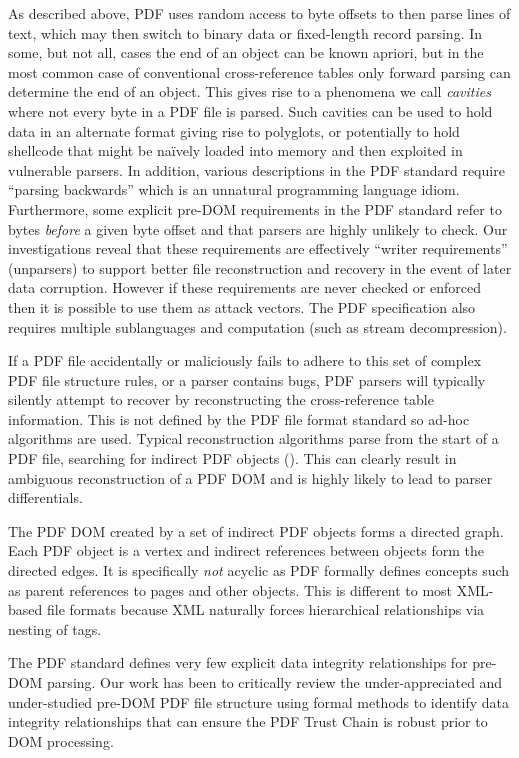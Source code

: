 As described above, PDF uses random access to byte offsets to then parse lines of text,
which may then switch to binary data or fixed-length record parsing. 
In some, but not all, cases the end of an object can be known apriori, but in the most common case 
of conventional cross-reference tables only forward parsing can determine the end of an object. 
This gives rise to a phenomena we call \emph{cavities} where not every byte in a PDF file is parsed.
Such cavities can be used to hold data in an alternate format giving rise to polyglots, or potentially
to hold shellcode that might be na\"ively loaded into memory and then exploited 
in vulnerable parsers.
In addition, various descriptions in the PDF standard require ``parsing backwards'' which is 
an unnatural programming language idiom. Furthermore, some explicit pre-DOM requirements
in the PDF standard
refer to bytes \emph{before} a given byte offset and that parsers are highly unlikely to check. 
Our investigations reveal that these requirements are effectively ``writer requirements'' (unparsers) to
support better file reconstruction and recovery in the event of later data corruption. 
However if these requirements are never checked or enforced then it is possible to use them as attack
vectors.  
The PDF specification also requires multiple
sublanguages and computation (such as stream decompression).

If a PDF file accidentally or maliciously fails to adhere to this set of complex PDF file structure
rules, or a parser contains bugs, PDF parsers will typically silently attempt to recover
by reconstructing the cross-reference table information. 
This is not defined by the PDF file format standard so 
ad-hoc algorithms are used. Typical reconstruction algorithms parse from the start of a PDF 
file, searching for indirect PDF objects (). This can clearly result
in ambiguous reconstruction of a PDF DOM and is highly likely to lead to parser differentials.

The PDF DOM created by a set of indirect PDF objects forms a directed graph. 
Each PDF object is a vertex and indirect references between objects form the directed edges. It is 
specifically \emph{not} acyclic as PDF formally defines concepts such as parent references to 
pages and other objects. This is different to most XML-based file formats because XML naturally 
forces hierarchical relationships via nesting of tags.

The PDF standard defines very few explicit data integrity relationships for pre-DOM parsing. 
Our work has been to critically review the under-appreciated and under-studied pre-DOM PDF
file structure using formal methods to identify data integrity relationships that can 
ensure the PDF Trust Chain is robust prior to DOM processing.

